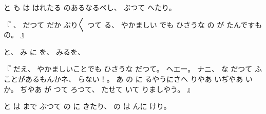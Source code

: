 %
と
も
は
はれたる
のあるなるべし、
%
ぶつて
へたり。

%
『
、
%
だつて
だか
ぶり〳〵
つて
る、
%
やかましい
でも
ひさうな
の
が
たんですもの。
』

%
と、
%
み
に
を、%
%
みるを、

%
『
だえ、
%
やかましいことでも
ひさうな
だつて。
%
ヘエー。
%
ナニ、
%
な
だつて
ふことがあるもんかネ、
%
らない！。
%
あ
の
に
るやうにさへ
りやあ
いぢやあ
いか。
%
ぢやあ
が
つて
ろつて、
%
たせて
いて
りましやう。
』

%
と
は
まで
ぶつて
の
に
きたり、
%
の
は
んに
けり。

